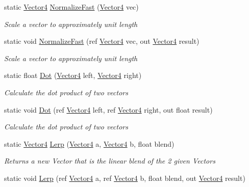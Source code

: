 \begin{DoxyCompactItemize}
static \hyperlink{struct_open_t_k_1_1_vector4}{Vector4} \hyperlink{struct_open_t_k_1_1_vector4_a5ca59acae7f341057d4808bd2c4f2623}{Normalize\-Fast} (\hyperlink{struct_open_t_k_1_1_vector4}{Vector4} vec)
\begin{DoxyCompactList}\small\item\em Scale a vector to approximately unit length \end{DoxyCompactList}\item 
static void \hyperlink{struct_open_t_k_1_1_vector4_ad11c124ba7fb36eecf4b370c35e9c2f6}{Normalize\-Fast} (ref \hyperlink{struct_open_t_k_1_1_vector4}{Vector4} vec, out \hyperlink{struct_open_t_k_1_1_vector4}{Vector4} result)
\begin{DoxyCompactList}\small\item\em Scale a vector to approximately unit length \end{DoxyCompactList}\item 
static float \hyperlink{struct_open_t_k_1_1_vector4_ad29fcfe8260bf92532dc36ffb8efb9c9}{Dot} (\hyperlink{struct_open_t_k_1_1_vector4}{Vector4} left, \hyperlink{struct_open_t_k_1_1_vector4}{Vector4} right)
\begin{DoxyCompactList}\small\item\em Calculate the dot product of two vectors \end{DoxyCompactList}\item 
static void \hyperlink{struct_open_t_k_1_1_vector4_a9b63280f186568aaab73113722a36bc6}{Dot} (ref \hyperlink{struct_open_t_k_1_1_vector4}{Vector4} left, ref \hyperlink{struct_open_t_k_1_1_vector4}{Vector4} right, out float result)
\begin{DoxyCompactList}\small\item\em Calculate the dot product of two vectors \end{DoxyCompactList}\item 
static \hyperlink{struct_open_t_k_1_1_vector4}{Vector4} \hyperlink{struct_open_t_k_1_1_vector4_a53f0b810570708b062045698f559a2ab}{Lerp} (\hyperlink{struct_open_t_k_1_1_vector4}{Vector4} a, \hyperlink{struct_open_t_k_1_1_vector4}{Vector4} b, float blend)
\begin{DoxyCompactList}\small\item\em Returns a new Vector that is the linear blend of the 2 given Vectors \end{DoxyCompactList}\item 
static void \hyperlink{struct_open_t_k_1_1_vector4_ae8ef56a691242f2491238f0c9c12e7ee}{Lerp} (ref \hyperlink{struct_open_t_k_1_1_vector4}{Vector4} a, ref \hyperlink{struct_open_t_k_1_1_vector4}{Vector4} b, float blend, out \hyperlink{struct_open_t_k_1_1_vector4}{Vector4} result)

\end{DoxyCompactItemize}

